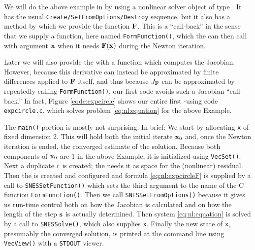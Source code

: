 We will do the above example in \PETSc by using a nonlinear solver object of type \pSNES.  It has the usual \texttt{Create/SetFromOptions/Destroy} sequence, but it also has a method by which we provide the function $\mathbf{F}$.  This is a ``call-back'' in the sense that we supply a function, here named \texttt{FormFunction()}, which the \pSNES can then call with argument $\mathbf{x}$ when it needs $\mathbf{F}(\mathbf{x})$ during the Newton iteration.

Later we will also provide the \pSNES with a function which computes the Jacobian.  However, because this derivative can instead be approximated by finite differences applied to $\mathbf{F}$ itself, and thus because $J_{\mathbf{F}}$ can be approximated by repeatedly calling \texttt{FormFunction()}, our first code avoids such a Jacobian ``call-back.''  In fact, Figure \ref{code:expcircle} shows our entire first \pSNES-using code \texttt{expcircle.c}, which solves problem \eqref{eq:nl:equation} for the above Example.

\vfill
{}

The \texttt{main()} portion is mostly not surprising.  In brief:  We start by allocating \pVec \texttt{x} of fixed dimension 2.  This will hold both the initial iterate $\mathbf{x}_0$ and, once the Newton iteration is ended, the converged estimate of the solution.  Because both components of $\mathbf{x}_0$ are $1$ in the above Example, it is initialized using \texttt{VecSet()}.  Next a duplicate \pVec \texttt{r} is created; the \pSNES needs it as space for the (nonlinear) residual.  Then the \pSNES is created and configured and formula \eqref{eq:nl:expcircleF} is supplied by a call to \texttt{SNESSetFunction()} which sets the third argument to the name of the C function \texttt{FormFunction()}.  Then we call \texttt{SNESSetFromOptions()} because it gives us run-time control both on how the Jacobian is calculated and on how the length of the step $\mathbf{s}$ is actually determined.  Then system \eqref{eq:nl:equation} is solved by a call to \texttt{SNESSolve()}, which also supplies \pVec \texttt{x}.  Finally the new state of \texttt{x}, presumably the converged solution, is printed at the command line using \texttt{VecView()} with a \texttt{STDOUT} viewer.

